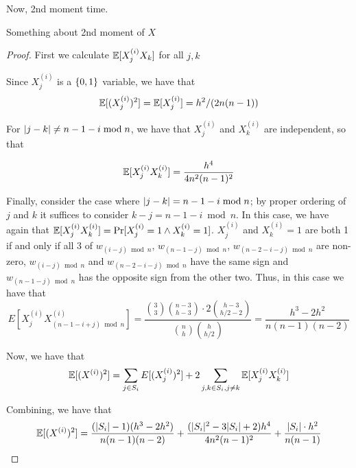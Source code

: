 Now, 2nd moment time. 

\begin{lemma}
Something about 2nd moment of $X$
\end{lemma}

\begin{proof}
First we calculate $\operatorname*{\mathbb{E}}[X^{(i)}_jX_k]$ for all $j,k$


Since $X^{(i)}_j$ is a $\{0,1\}$ variable, we have that
\[\operatorname*{\mathbb{E}}[(X^{(i)}_j)^2]=\operatorname*{\mathbb{E}}[X^{(i)}_j]=h^2/(2n(n-1))\]

For $\lvert j - k\rvert \neq n - 1 - i \bmod{n}$, we have that $X^{(i)}_j$
and $X^{(i)}_k$ are independent, so that 

\[\operatorname*{\mathbb{E}}[X^{(i)}_jX^{(i)}_k]=\frac{h^4}{4n^2(n-1)^2}\]

Finally, consider the case where $\lvert j-k\rvert = n - 1 - i \bmod{n}$; by
proper ordering of $j$ and $k$ it suffices to consider
$k-j=n-1-i\bmod{n}$. In this case, we have again that 
$\operatorname*{\mathbb{E}}[X^{(i)}_jX^{(i)}_k]=\Pr[X^{(i)}_j=1 \wedge
X^{(i)}_k=1]$. $X^{(i)}_j$ and $X^{(i)}_k=1$ are both 1 if and only if
all 3 of $w_{(i-j) \bmod{n}}$, $w_{(n-1-j) \bmod{n}}$, $w_{(n-2-i-j)
  \bmod{n}}$ are non-zero, $w_{(i-j) \bmod{n}}$ and  $w_{(n-2-i-j)
  \bmod{n}}$ have the same sign and $w_{(n-1-j) \bmod{n}}$ has the
  opposite sign from the other two. Thus, in this case we have that 
\[E[X^{(i)}_jX^{(i)}_{(n-1-i+j)\bmod{n}}]=\frac{\binom{3}{3}\binom{n-3}{h-3}\cdot
  2\binom{h-3}{h/2-2}}{\binom{n}{h}\binom{h}{h/2}}=\frac{h^3-2h^2}{n(n-1)(n-2)}\]


Now, we have that 
\[\operatorname*{\mathbb{E}}[(X^{(i)})^2]=\sum_{j \in S_i}E[(X^{(i)}_j)^2] + 2\sum_{j,k \in
    S_i, j\neq k}\operatorname*{\mathbb{E}}[X^{(i)}_jX^{(i)}_k]\]

Combining, we have that 
\[\operatorname*{\mathbb{E}}[(X^{(i)})^2]=\frac{(\lvert S_i\rvert-1)(h^3-2h^2)}{n(n-1)(n-2)}+\frac{(\lvert S_i\rvert^2-3\lvert S_i\rvert+2)h^4}{4n^2(n-1)^2}+\frac{\lvert S_i\rvert\cdot h^2}{n(n-1)}\]
\end{proof}




